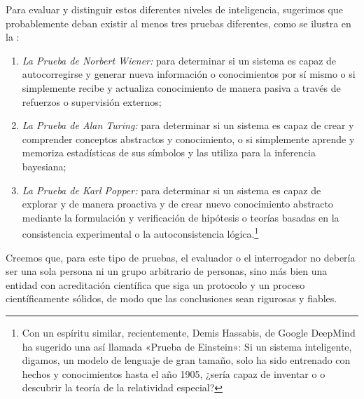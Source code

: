 \documentclass[../../book-main_es.tex]{subfiles}
\begin{document}
Para evaluar y distinguir estos diferentes niveles de inteligencia,
sugerimos que probablemente deban existir al menos tres pruebas diferentes,
como se ilustra en la :
\begin{enumerate}
    \item \textit{La Prueba de Norbert Wiener:} para determinar si un
        sistema es capaz de autocorregirse y generar nueva información o conocimientos 
        por sí mismo o si simplemente recibe y actualiza conocimiento
        de manera pasiva a través de refuerzos o supervisión externos;
    \item \textit{La Prueba de Alan Turing:} para determinar si un
        sistema es capaz de crear y comprender conceptos abstractos y
        conocimiento, o si simplemente aprende y memoriza estadísticas de sus
        símbolos y las utiliza para la inferencia bayesiana;
    \item \textit{La Prueba de Karl Popper:} para determinar si un
        sistema es capaz de explorar y de manera proactiva y de crear nuevo conocimiento abstracto
        mediante la formulación y verificación de hipótesis o teorías
        basadas en la consistencia experimental o la autoconsistencia lógica.\footnote{Con un espíritu similar, recientemente, Demis Hassabis, de Google 
        DeepMind ha sugerido una así llamada «Prueba de Einstein»: 
        Si un sistema inteligente, digamos, un modelo de lenguaje de gran tamaño, solo ha sido
        entrenado con hechos y conocimientos hasta el año 1905, ¿sería capaz
        de inventar o o descubrir la teoría de la relatividad especial?}
\end{enumerate}
Creemos que, para este tipo de pruebas, el evaluador o el interrogador
no debería ser una sola persona ni un grupo arbitrario de personas, sino más bien una
entidad con acreditación científica que siga un protocolo y un proceso
científicamente sólidos, de modo que las conclusiones sean rigurosas y fiables.
\end{document}
